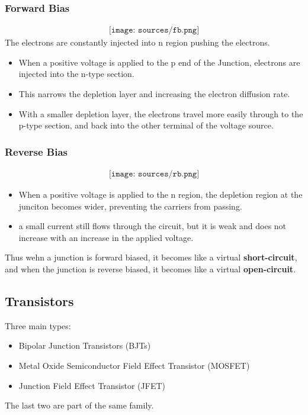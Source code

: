 \documentclass[12pt]{article}
\theoremstyle{definition}
\begin{document}
\subsubsection{Forward Bias}
\begin{align*}
    \texttt{[image: sources/fb.png]}
\end{align*}
The electrons are constantly injected into n region pushing the electrons.
\begin{itemize}
    \item When a positive voltage is applied to the p end of the Junction, electrons are injected into the n-type section.
    \item This narrows the depletion layer and increasing the electron diffusion rate.
    \item With a smaller depletion layer, the electrons travel more easily through to the p-type section, and back into the other terminal of the voltage source.
\end{itemize}
\subsubsection{Reverse Bias}
\begin{align*}
    \texttt{[image: sources/rb.png]}
\end{align*}
\begin{itemize}
    \item When a positive voltage is applied to the n region, the depletion region at the junciton becomes wider, preventing the carriers from passing.
    \item a small current still flows through the circuit, but it is weak and does not increase with an increase in the applied voltage.
\end{itemize}
Thus wehn a junction is forward biased, it becomes like a virtual \textbf{short-circuit}, and when the junction is reverse biased, it becomes like a virtual \textbf{open-circuit}.
\subsection{Transistors}
Three main types:
\begin{itemize}
    \item Bipolar Junction Transistors (BJTs)
    \item Metal Oxide Semiconductor Field Effect Transistor (MOSFET)
    \item Junction Field Effect Transistor (JFET)
\end{itemize}
The last two are part of the same family.
\end{document}
